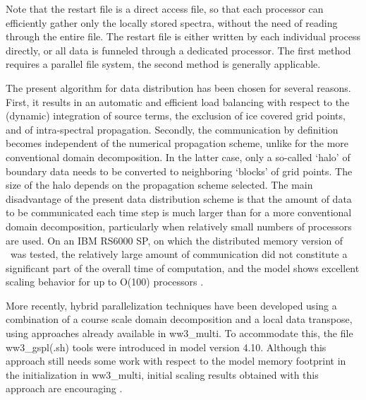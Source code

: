 \noindent
Note that the restart file is a direct access file, so that each processor can
efficiently gather only the locally stored spectra, without the need of
reading through the entire file. The restart file is either written by each
individual process directly, or all data is funneled through a dedicated
processor. The first method requires a parallel file system, the second method
is generally applicable. 

The present algorithm for data distribution has been chosen for several
reasons. First, it results in an automatic and efficient load balancing with
respect to the (dynamic) integration of source terms, the exclusion of ice
covered grid points, and of intra-spectral propagation. Secondly, the
communication by definition becomes independent of the numerical propagation
scheme, unlike for the more conventional domain decomposition. In the latter
case, only a so-called `halo' of boundary data needs to be converted to
neighboring `blocks' of grid points. The size of the halo depends on the
propagation scheme selected. The main disadvantage of the present data
distribution scheme is that the amount of data to be communicated each time
step is much larger than for a more conventional domain decomposition,
particularly when relatively small numbers of processors are used. On an IBM
RS6000 SP, on which the distributed memory version of \ws\ was tested, the
relatively large amount of communication did not constitute a significant part
of the overall time of computation, and the model shows excellent scaling
behavior for up to O(100) processors \citep{tol:PACO02}.

More recently, hybrid parallelization techniques have been developed using a
combination of a course scale domain decomposition and a local data transpose,
using approaches already available in {\file ww3\_multi}. To accommodate this,
the {file ww3\_gspl(.sh)} tools were introduced in model version
4.10. Although this approach still needs some work with respect to the model
memory footprint in the initialization in {\file ww3\_multi}, initial scaling
results obtained with this approach are encouraging \cite[see][]{tol:MMAB13b}.
